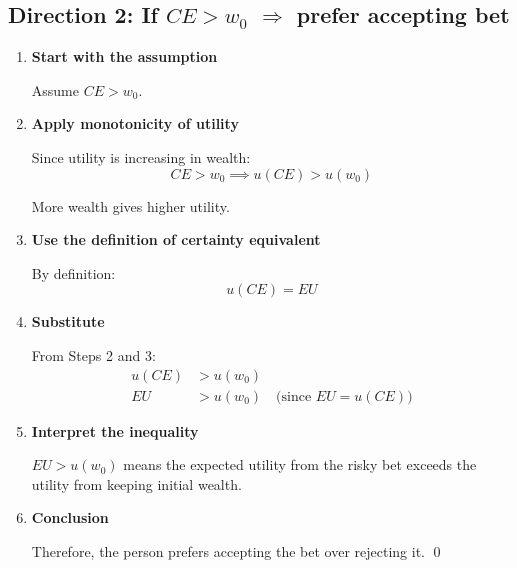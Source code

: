 \documentclass[12pt]{article}
\begin{document}
\newpage

\subsection*{Direction 2: If $CE > w_0$ $\Rightarrow$ prefer accepting bet}

\begin{enumerate}[leftmargin=*, label=\textbf{Step \arabic*:}]
    \item \textbf{Start with the assumption}

    Assume $CE > w_0$.

    \vspace{0.3cm}

    \item \textbf{Apply monotonicity of utility}

    Since utility is increasing in wealth:
    \begin{equation}
    CE > w_0 \implies u(CE) > u(w_0)
    \end{equation}

    More wealth gives higher utility.

    \vspace{0.3cm}

    \item \textbf{Use the definition of certainty equivalent}

    By definition:
    \begin{equation}
    u(CE) = EU
    \end{equation}

    \vspace{0.3cm}

    \item \textbf{Substitute}

    From Steps 2 and 3:
    \begin{align}
    u(CE) &> u(w_0) \\
    EU &> u(w_0) \quad \text{(since } EU = u(CE)\text{)}
    \end{align}

    \vspace{0.3cm}

    \item \textbf{Interpret the inequality}

    $EU > u(w_0)$ means the expected utility from the risky bet exceeds the utility from keeping initial wealth.

    \vspace{0.3cm}

    \item \textbf{Conclusion}

    Therefore, the person prefers accepting the bet over rejecting it. \qed
\end{enumerate}
\end{document}
